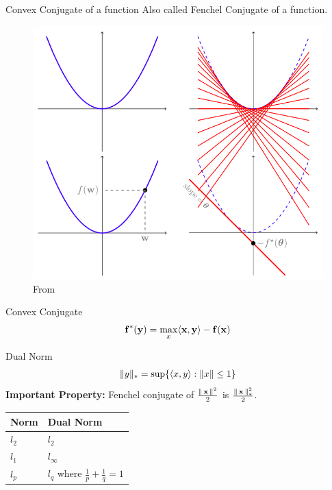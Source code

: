 \begin{frame}{Convex Conjugate of a function}
  Also called Fenchel Conjugate of a function.
  \begin{figure}
    \includegraphics[scale=0.27]{images/fenchel.png}
    \caption{From \cite{ShSh2012}}
  \end{figure}
\end{frame}

\begin{frame}{Convex Conjugate}
  \begin{align*}
    {\operatorname{\mathbf{f}}}^{*}(\operatorname{\mathbf{y}}) = \max_x \langle {\operatorname{\mathbf{x}}} , {\operatorname{\mathbf{y}}} \rangle - \operatorname{\mathbf{f}}(\operatorname{\mathbf{x}})
  \end{align*}
\end{frame}

\begin{frame}{Dual Norm}
  \begin{align*}
    \|y\|_{*} = \sup\{\langle {x} , {y} \rangle : \|x\| \le 1\}
  \end{align*}
      {\bf Important Property:} Fenchel conjugate of $\frac{\|\operatorname{\mathbf{x}}\|^2}{2}$ is $\frac{\|\operatorname{\mathbf{x}}\|_{*}^2}{2}$.
      \begin{center}
        \begin{tabular}{ll}
          Norm & Dual Norm\\
          \hline
          $l_2$ & $l_2$\\
          $l_1$ & $l_{\infty}$\\
          $l_p$ & $l_q$ where $\frac{1}{p}+\frac{1}{q}=1$\\
        \end{tabular}
      \end{center}
\end{frame}

